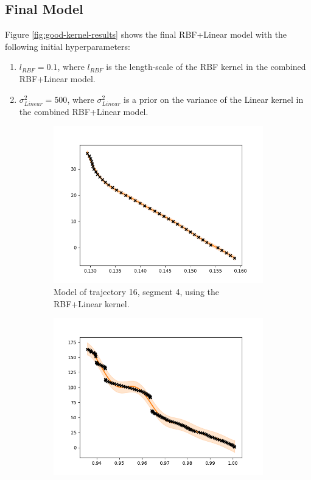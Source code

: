 \subsection{Final Model}
Figure \ref{fig:good-kernel-results} shows the final RBF+Linear model with the following initial hyperparameters:
\begin{enumerate}
    \item $l_{RBF}=0.1$, where $l_{RBF}$ is the length-scale of the RBF kernel in the combined RBF+Linear model.
    \item $\sigma_{Linear}^2=500$, where $\sigma_{Linear}^2$ is a prior on the variance of the Linear kernel in the combined RBF+Linear model.
\end{enumerate}

\begin{figure}
    \centering
    \begin{subfigure}[b]{0.475\textwidth}   
        \centering
        \includegraphics[width=\textwidth]{figures/forecasting/gp_16_4_rbf_linear}
        \caption[]%
        {{\small Model of trajectory 16, segment 4, using the RBF+Linear kernel.}}    
        \label{fig:16-4-rbf-linear}
    \end{subfigure}
    \quad
    \begin{subfigure}[b]{0.475\textwidth}   
        \centering 
        \includegraphics[width=\textwidth]{figures/forecasting/gp_26_18_rbf_linear}

\end{subfigure}
\end{figure}
